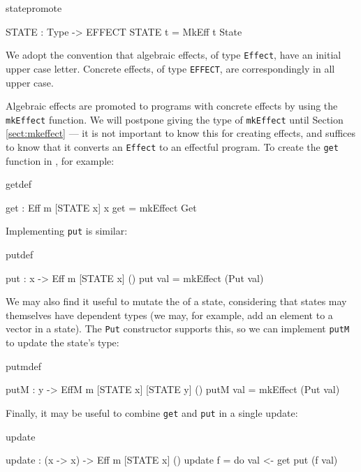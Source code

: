 \begin{SaveVerbatim}{statepromote}

STATE : Type -> EFFECT
STATE t = MkEff t State

\end{SaveVerbatim}

\noindent
We adopt the convention that algebraic effects, of type \texttt{Effect},
have an initial upper case letter. Concrete effects, of type \texttt{EFFECT},
are correspondingly in all upper case.

Algebraic effects are promoted to \Eff{} programs with concrete effects
by using the
\texttt{mkEffect} function. We will postpone giving the type of
\texttt{mkEffect} until Section \ref{sect:mkeffect} --- it is not important to
know this for creating effects, and suffices to know that it converts an
\texttt{Effect} to an effectful program. To create the \texttt{get} function in
\Eff{}, for example:

\begin{SaveVerbatim}{getdef}

get : Eff m [STATE x] x
get = mkEffect Get 

\end{SaveVerbatim}

\noindent
Implementing \texttt{put} is similar:

\begin{SaveVerbatim}{putdef}

put : x -> Eff m [STATE x] ()
put val = mkEffect (Put val)

\end{SaveVerbatim}

\noindent
We may also find it useful to mutate the  of a state, considering
that states may themselves have dependent types (we may, for example, add
an element to a vector in a state). The \texttt{Put} constructor supports this,
so we can implement \texttt{putM} to update the state's type:

\begin{SaveVerbatim}{putmdef}

putM : y -> EffM m [STATE x] [STATE y] ()
putM val = mkEffect (Put val)

\end{SaveVerbatim}

\noindent
Finally, it may be useful to combine \texttt{get} and \texttt{put} in a single
update:

\begin{SaveVerbatim}{update}

update : (x -> x) -> Eff m [STATE x] ()
update f = do val <- get
              put (f val) 

\end{SaveVerbatim}

